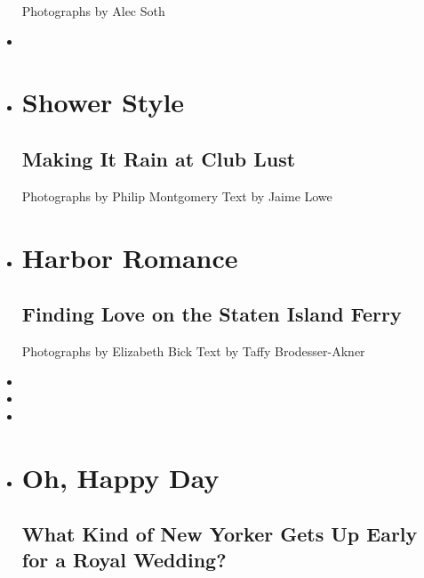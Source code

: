 \begin{itemize}
   Photographs by Alec Soth 
\item
\item
  \href{https://www.nytimes3xbfgragh.onion/interactive/2018/06/07/magazine/new-york-love-club-lust.html}{}

  \hypertarget{shower-style}{%
  \section{Shower Style}\label{shower-style}}

  \hypertarget{making-it-rain-at-club-lust}{%
  \subsection{Making It Rain at Club
  Lust}\label{making-it-rain-at-club-lust}}

   Photographs by Philip Montgomery Text by Jaime Lowe 
\item
  \href{https://www.nytimes3xbfgragh.onion/interactive/2018/06/07/magazine/new-york-love-staten-island-ferry.html}{}

  \hypertarget{harbor-romance}{%
  \section{Harbor Romance}\label{harbor-romance}}

  \hypertarget{finding-love-on-the-staten-island-ferry}{%
  \subsection{Finding Love on the Staten Island
  Ferry}\label{finding-love-on-the-staten-island-ferry}}

   Photographs by Elizabeth Bick Text by Taffy Brodesser-Akner 
\item
\item
\item
\item
  \href{https://www.nytimes3xbfgragh.onion/interactive/2018/06/07/magazine/new-york-love-watching-royal-wedding.html}{}

  \hypertarget{oh-happy-day}{%
  \section{Oh, Happy Day}\label{oh-happy-day}}

  \hypertarget{what-kind-of-new-yorker-gets-up-early-for-a-royal-wedding}{%
  \subsection{What Kind of New Yorker Gets Up Early for a Royal
  Wedding?}\label{what-kind-of-new-yorker-gets-up-early-for-a-royal-wedding}}


\end{itemize}
